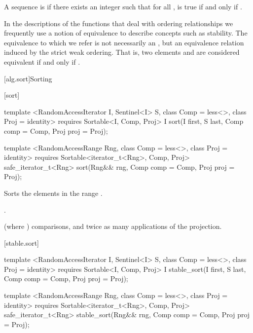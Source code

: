 \pnum
A sequence
is
if there exists an integer
such that for all
,
is true if and only if
.

\pnum
In the descriptions of the functions that deal with ordering relationships we frequently use a notion of
equivalence to describe concepts such as stability.
The equivalence to which we refer is not necessarily an
,
but an equivalence relation induced by the strict weak ordering.
That is, two elements
and
are considered equivalent if and only if
.

[alg.sort]{Sorting}

[sort]{}

%
\begin{itemdecl}
template <RandomAccessIterator I, Sentinel<I> S, class Comp = less<>,
    class Proj = identity>
  requires Sortable<I, Comp, Proj>
  I sort(I first, S last, Comp comp = Comp{}, Proj proj = Proj{});

template <RandomAccessRange Rng, class Comp = less<>, class Proj = identity>
  requires Sortable<iterator_t<Rng>, Comp, Proj>
  safe_iterator_t<Rng>
    sort(Rng&& rng, Comp comp = Comp{}, Proj proj = Proj{});
\end{itemdecl}

\begin{itemdescr}
\pnum
\effects
Sorts the elements in the range
.

\pnum
\returns {}.

\pnum
\complexity
{}
(where
)
comparisons, and twice as many applications of the projection.
\end{itemdescr}

[stable.sort]{}

%
\begin{itemdecl}
template <RandomAccessIterator I, Sentinel<I> S, class Comp = less<>,
    class Proj = identity>
  requires Sortable<I, Comp, Proj>
  I stable_sort(I first, S last, Comp comp = Comp{}, Proj proj = Proj{});

template <RandomAccessRange Rng, class Comp = less<>, class Proj = identity>
  requires Sortable<iterator_t<Rng>, Comp, Proj>
  safe_iterator_t<Rng>
    stable_sort(Rng&& rng, Comp comp = Comp{}, Proj proj = Proj{});
\end{itemdecl}

